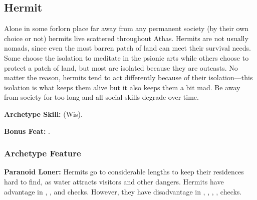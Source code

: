 \subsection{Hermit}
Alone in some forlorn place far away from any permanent society (by their own choice or not) hermits live scattered throughout Athas. Hermits are not usually nomads, since even the most barren patch of land can meet their survival needs. Some choose the isolation to meditate in the psionic arts while others choose to protect a patch of land, but most are isolated because they are outcasts. No matter the reason, hermits tend to act differently because of their isolation---this isolation is what keeps them alive but it also keeps them a bit mad. Be away from society for too long and all social skills degrade over time.

\textbf{Archetype Skill:}  (Wis).

\textbf{Bonus Feat:} .

\subsubsection{Archetype Feature}
\textbf{Paranoid Loner:} Hermits go to considerable lengths to keep their residences hard to find, as water attracts visitors and other dangers. Hermits have advantage in , , and  checks. However, they have disadvantage in , , , ,  checks.
